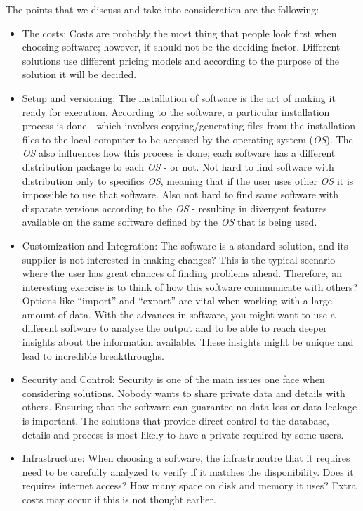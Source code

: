 \documentclass[ppgc,mestrado,english]{iiufrgs}
\begin{document}
The points that we discuss and take into consideration are the following:
\begin{itemize}
\item The costs: Costs are probably the most thing that people look first when choosing software; however, it should not be the deciding factor. Different solutions use different pricing models and according to the purpose of the solution it will be decided.

\item Setup and versioning: The installation of software is the act of making it ready for execution. According to the software, a particular installation process is done - which involves copying/generating files from the installation files to the local computer to be accessed by the operating system (\emph{OS}). The \emph{OS} also influences how this process is done; each software has a different distribution package to each \emph{OS} - or not. Not hard to find software with distribution only to specifics \emph{OS}, meaning that if the user uses other \emph{OS} it is impossible to use that software. Also not hard to find same software with disparate versions according to the \emph{OS} - resulting in divergent features available on the same software defined by the \emph{OS} that is being used.

\item Customization and Integration: The software is a standard solution, and its supplier is not interested in making changes? This is the typical scenario where the user has great chances of finding problems ahead. Therefore, an interesting exercise is to think of how this software communicate with others? Options like  ``import'' and ``export'' are vital when working with a large amount of data. With the advances in software, you might want to use a different software to analyse the output and to be able to reach deeper insights about the information available. These insights might be unique and lead to incredible breakthroughs.

\item Security and Control: Security is one of the main issues one face when considering solutions. Nobody wants to share private data and details with others. Ensuring that the software can guarantee no data loss or data leakage is important. The solutions that provide direct control to the database, details and process is most likely to have a private required by some users.

\item Infrastructure: When choosing a software, the infrastrucutre that it requires need to be carefully analyzed to verify if it matches the disponibility. Does it requires internet access? How many space on disk and memory it uses? Extra costs may occur if this is not thought earlier.


\end{itemize}
\end{document}
